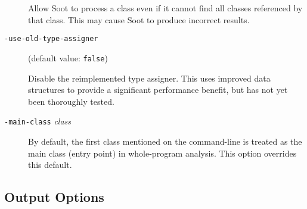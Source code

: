 \documentclass{article}
\begin{document}
\begin{description}
Allow Soot to process a class even if it cannot find all classes
referenced by that class. This may cause Soot to produce
incorrect results.



  \item[
  {\tt -use-old-type-assigner}]

(default value: {\tt false})

Disable the reimplemented type assigner. This uses improved data 
structures to provide a significant performance benefit, but has
not yet been thoroughly tested.



  \item[
  {\tt -main-class}{ \it class}]


\par

By default, the first class mentioned on the command-line is treated
as the main class (entry point) in whole-program analysis. This option
overrides this default.




\end{description}


\subsection{Output Options}
\end{document}
